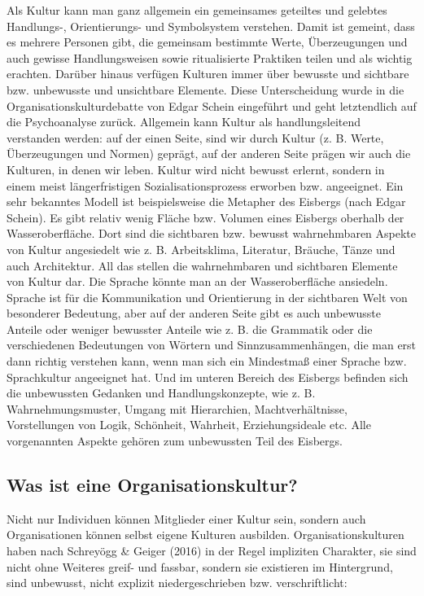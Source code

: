 \documentclass[
  letterpaper,
]{book}
\begin{document}
Als Kultur kann man ganz allgemein ein gemeinsames geteiltes und
gelebtes Handlungs-, Orientierungs- und Symbolsystem verstehen. Damit
ist gemeint, dass es mehrere Personen gibt, die gemeinsam bestimmte
Werte, Überzeugungen und auch gewisse Handlungsweisen sowie
ritualisierte Praktiken teilen und als wichtig erachten. Darüber hinaus
verfügen Kulturen immer über bewusste und sichtbare bzw. unbewusste und
unsichtbare Elemente. Diese Unterscheidung wurde in die
Organisationskulturdebatte von Edgar Schein eingeführt und geht
letztendlich auf die Psychoanalyse zurück. Allgemein kann Kultur als
handlungsleitend verstanden werden: auf der einen Seite, sind wir durch
Kultur (z. B. Werte, Überzeugungen und Normen) geprägt, auf der anderen
Seite prägen wir auch die Kulturen, in denen wir leben. Kultur wird
nicht bewusst erlernt, sondern in einem meist längerfristigen
Sozialisationsprozess erworben bzw. angeeignet. Ein sehr bekanntes
Modell ist beispielsweise die Metapher des Eisbergs (nach Edgar Schein).
Es gibt relativ wenig Fläche bzw. Volumen eines Eisbergs oberhalb der
Wasseroberfläche. Dort sind die sichtbaren bzw. bewusst wahrnehmbaren
Aspekte von Kultur angesiedelt wie z. B. Arbeitsklima, Literatur,
Bräuche, Tänze und auch Architektur. All das stellen die wahrnehmbaren
und sichtbaren Elemente von Kultur dar. Die Sprache könnte man an der
Wasseroberfläche ansiedeln. Sprache ist für die Kommunikation und
Orientierung in der sichtbaren Welt von besonderer Bedeutung, aber auf
der anderen Seite gibt es auch unbewusste Anteile oder weniger bewusster
Anteile wie z. B. die Grammatik oder die verschiedenen Bedeutungen von
Wörtern und Sinnzusammenhängen, die man erst dann richtig verstehen
kann, wenn man sich ein Mindestmaß einer Sprache bzw. Sprachkultur
angeeignet hat. Und im unteren Bereich des Eisbergs befinden sich die
unbewussten Gedanken und Handlungskonzepte, wie z. B.
Wahrnehmungsmuster, Umgang mit Hierarchien, Machtverhältnisse,
Vorstellungen von Logik, Schönheit, Wahrheit, Erziehungsideale etc. Alle
vorgenannten Aspekte gehören zum unbewussten Teil des Eisbergs.

\subsection{Was ist eine
Organisationskultur?}\label{was-ist-eine-organisationskultur}

Nicht nur Individuen können Mitglieder einer Kultur sein, sondern auch
Organisationen können selbst eigene Kulturen ausbilden.
Organisationskulturen haben nach Schreyögg \& Geiger (2016) in der Regel
impliziten Charakter, sie sind nicht ohne Weiteres greif- und fassbar,
sondern sie existieren im Hintergrund, sind unbewusst, nicht explizit
niedergeschrieben bzw. verschriftlicht:
\end{document}
